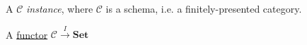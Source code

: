 A $\mathcal{C}$ \emph{instance}, where $\mathcal{C}$ is a schema, i.e. a finitely-presented category.

A \hyperref[D3.35]{functor} $\mathcal{C} \xrightarrow{I} \mathbf{Set}$
